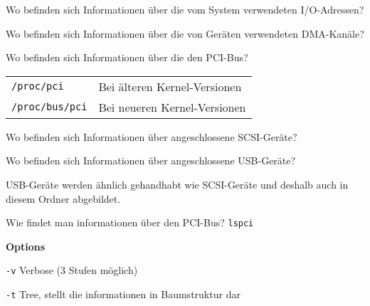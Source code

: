 \begin{flashcard}[Folder]{Wo befinden sich Informationen über die vom System verwendeten I/O-Adressen?}
	
	
\end{flashcard}

\begin{flashcard}[Folder]{Wo befinden sich Informationen über die von Geräten verwendeten DMA-Kanäle?}
\end{flashcard}

\begin{flashcard}[Folder]{Wo befinden sich Informationen über die den PCI-Bus?}
	
	\begin{tabular}{ll}
		\texttt{/proc/pci} & Bei älteren Kernel-Versionen\\
		\texttt{/proc/bus/pci} & Bei neueren Kernel-Versionen\\
	\end{tabular}
\end{flashcard}

\begin{flashcard}[Folder]{Wo befinden sich Informationen über angeschlossene SCSI-Geräte?}
	
	
\end{flashcard}

\begin{flashcard}[Folder]{Wo befinden sich Informationen über angeschlossene USB-Geräte?}
	
	USB-Geräte werden ähnlich gehandhabt wie SCSI-Geräte und deshalb auch in diesem Ordner abgebildet.
	
	
\end{flashcard}

\begin{flashcard}[Command]{Wie findet man informationen über den PCI-Bus?}
	\texttt{lspci}

	\begin{description}	
	\item \textbf{Options}
	
		\begin{description}
			\item \texttt{-v} Verbose (3 Stufen möglich)
			
			\item \texttt{-t} Tree, stellt die informationen in Baumstruktur dar
		\end{description}
	\end{description}
	
\end{flashcard}

